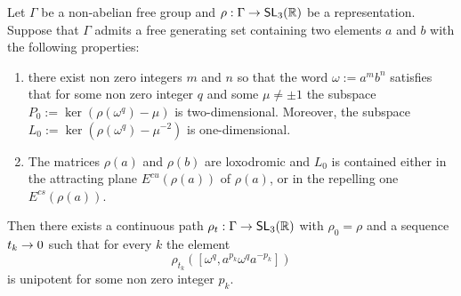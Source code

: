 \documentclass[AHL,Unicode,longabstracts]{cedram}
\DeclareMathOperator{\SL}{\mathsf{SL}}
\newcommand{\R}{\mathbb{R}}
\newcommand{\Ecs}{E^{cs}}
\newcommand{\Ecu}{E^{cu}}
\renewcommand*{\to}{\mathchoice{\longrightarrow}{\rightarrow}{\rightarrow}{\rightarrow}}
\begin{document}
\begin{prop}\label{prop: criterion for non robust qi}
Let $\Gamma$ be a non-abelian free group and $\rho:\Gamma\to \SL_3(\R)$ be a representation. Suppose that $\Gamma$ admits a free generating set containing two elements $a$ and $b$ with the following properties:
\begin{enumerate}
\item there exist non zero integers $m$ and $n$ so that the word $\omega:=a^mb^n$ satisfies that for some non zero integer $q$ and some $\mu\neq \pm 1$ the subspace $P_0:=\ker(\rho(\omega^q)-\mu)$ is two-dimensional. Moreover, the subspace $L_0:=\ker(\rho(\omega^q)-\mu^{-2})$ is one-dimensional.
\item The matrices $\rho(a)$ and $\rho(b)$ are loxodromic and $L_0$ is contained either in the attracting plane $\Ecu(\rho(a))$ of $\rho(a)$, or in the repelling one $\Ecs(\rho(a))$.
\end{enumerate}
Then there exists a continuous path $\rho_t:\Gamma\to\SL_3(\R)$ with $\rho_0=\rho$ and a sequence $t_k\to 0$ such that for every $k$ the element
\[
\rho_{t_k}([\omega^q,a^{p_k}\omega^qa^{-p_k}])
\]
is unipotent for some non zero integer $p_k$.
\end{prop}
\end{document}
